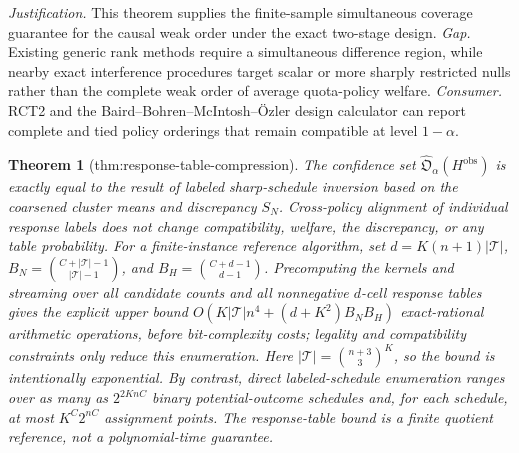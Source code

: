 \documentclass{article}
\newtheorem{theorem}{Theorem}
\begin{document}
\par\smallskip\noindent \textit{Justification.} This theorem supplies the finite-sample simultaneous coverage guarantee for the causal weak order under the exact two-stage design. \textit{Gap.} Existing generic rank methods require a simultaneous difference region, while nearby exact interference procedures target scalar or more sharply restricted nulls rather than the complete weak order of average quota-policy welfare. \textit{Consumer.} RCT2 and the Baird--Bohren--McIntosh--Özler design calculator can report complete and tied policy orderings that remain compatible at level \(1-\alpha\).

\begin{theorem}[thm:response-table-compression]\label{thm:response-table-compression}
The confidence set \(\widehat{\mathfrak O}_{\alpha}(H^{\mathrm{obs}})\) is exactly equal to the result of labeled sharp-schedule inversion based on the coarsened cluster means and discrepancy \(S_N\). Cross-policy alignment of individual response labels does not change compatibility, welfare, the discrepancy, or any table probability. For a finite-instance reference algorithm, set \(d=K(n+1)|\mathcal T|\), \(B_N=\binom{C+|\mathcal T|-1}{|\mathcal T|-1}\), and \(B_H=\binom{C+d-1}{d-1}\). Precomputing the kernels and streaming over all candidate counts and all nonnegative \(d\)-cell response tables gives the explicit upper bound \(O(K|\mathcal T|n^4+(d+K^2)B_NB_H)\) exact-rational arithmetic operations, before bit-complexity costs; legality and compatibility constraints only reduce this enumeration. Here \(|\mathcal T|=\binom{n+3}{3}^{K}\), so the bound is intentionally exponential. By contrast, direct labeled-schedule enumeration ranges over as many as \(2^{2KnC}\) binary potential-outcome schedules and, for each schedule, at most \(K^C2^{nC}\) assignment points. The response-table bound is a finite quotient reference, not a polynomial-time guarantee.
\end{theorem}
\end{document}
